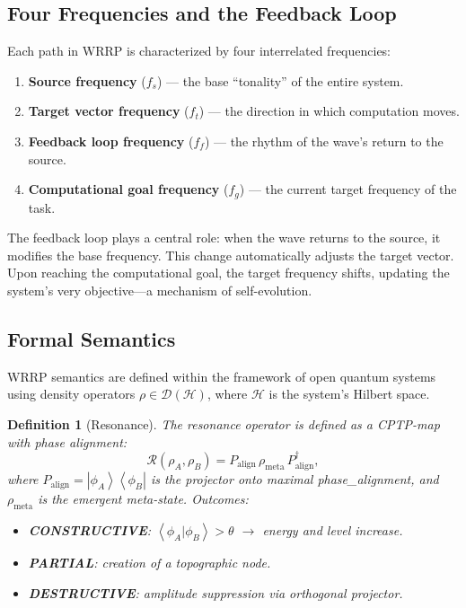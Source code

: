\documentclass[11pt,a4paper]{article}
\newcommand{\ket}[1]{\left|#1\right\rangle}
\newcommand{\bra}[1]{\left\langle#1\right|}
\newcommand{\braket}[2]{\left\langle#1|#2\right\rangle}
\newcommand{\density}{\mathcal{D}(\mathcal{H})}
\newtheorem{definition}{Definition}
\begin{document}
\subsection{Four Frequencies and the Feedback Loop}

Each path in WRRP is characterized by four interrelated frequencies:
\begin{enumerate}[leftmargin=*, label=\textbf{F\arabic*.}]
    \item \textbf{Source frequency} ($f_s$) --- the base ``tonality'' of the entire system.
    \item \textbf{Target vector frequency} ($f_t$) --- the direction in which computation moves.
    \item \textbf{Feedback loop frequency} ($f_f$) --- the rhythm of the wave's return to the source.
    \item \textbf{Computational goal frequency} ($f_g$) --- the current target frequency of the task.
\end{enumerate}

The feedback loop plays a central role: when the wave returns to the source, it modifies the base frequency. This change automatically adjusts the target vector. Upon reaching the computational goal, the target frequency shifts, updating the system's very objective---a mechanism of self-evolution.

\subsection{Formal Semantics}

WRRP semantics are defined within the framework of open quantum systems using density operators $\rho \in \density$, where $\mathcal{H}$ is the system's Hilbert space.

\begin{definition}[Resonance]
The resonance operator is defined as a CPTP-map with phase alignment:
\begin{equation}
    \mathcal{R}(\rho_A, \rho_B) = P_{\text{align}} \, \rho_{\text{meta}} \, P_{\text{align}}^\dagger,
\end{equation}
where $P_{\text{align}} = \ket{\phi_A}\bra{\phi_B}$ is the projector onto maximal \textit{phase\_alignment}, and $\rho_{\text{meta}}$ is the emergent meta-state. Outcomes:
\begin{itemize}[leftmargin=*]
    \item \textbf{CONSTRUCTIVE}: $\braket{\phi_A}{\phi_B} > \theta$ $\rightarrow$ energy and level increase.
    \item \textbf{PARTIAL}: creation of a topographic node.
    \item \textbf{DESTRUCTIVE}: amplitude suppression via orthogonal projector.
\end{itemize}
\end{definition}
\end{document}
